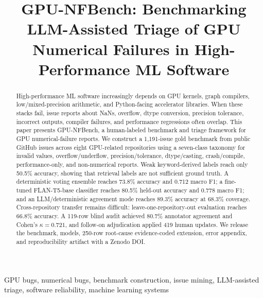 \documentclass[conference]{IEEEtran}
\newcommand{\bench}{GPU-NFBench}
\begin{document}
\title{\bench: Benchmarking LLM-Assisted Triage of GPU Numerical Failures in High-Performance ML Software}

\author{
}

\maketitle

\begin{abstract}
High-performance ML software increasingly depends on GPU kernels, graph
compilers, low/mixed-precision arithmetic, and Python-facing accelerator
libraries. When these stacks fail, issue reports about NaNs, overflow, dtype
conversion, precision tolerance, incorrect outputs, compiler failures, and
performance regressions often overlap. This paper presents \bench{}, a
human-labeled benchmark and triage framework for GPU numerical-failure reports.
We construct a 1,191-issue gold benchmark from public GitHub issues across
eight GPU-related repositories using a seven-class taxonomy for invalid values,
overflow/underflow, precision/tolerance, dtype/casting, crash/compile,
performance-only, and non-numerical reports. Weak keyword-derived labels reach
only 50.5\% accuracy, showing that retrieval labels are not sufficient ground
truth. A deterministic voting ensemble reaches 73.8\% accuracy and 0.712 macro
F1; a fine-tuned FLAN-T5-base classifier reaches 80.5\% held-out accuracy and
0.778 macro F1; and an LLM/deterministic agreement mode reaches 89.3\%
accuracy at 68.3\% coverage. Cross-repository transfer remains difficult:
leave-one-repository-out evaluation reaches 66.8\% accuracy. A 119-row blind
audit achieved 80.7\% annotator agreement and Cohen's $\kappa=0.721$, and
follow-on adjudication applied 419 human updates. We release the benchmark,
models, 250-row root-cause evidence-coded extension, error appendix, and
reproducibility artifact with a Zenodo DOI.
\end{abstract}

\begin{IEEEkeywords}
GPU bugs, numerical bugs, benchmark construction, issue mining, LLM-assisted
triage, software reliability, machine learning systems
\end{IEEEkeywords}
\end{document}
